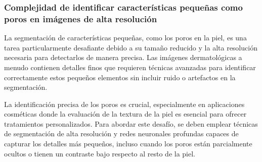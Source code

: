 \cite{zhao2021}

\subsubsection{Complejidad de identificar características pequeñas como poros en imágenes de alta resolución}
La segmentación de características pequeñas, como los poros en la piel, es una tarea particularmente desafiante debido a su tamaño reducido y la alta resolución necesaria para detectarlos de manera precisa. Las imágenes dermatológicas a menudo contienen detalles finos que requieren técnicas avanzadas para identificar correctamente estos pequeños elementos sin incluir ruido o artefactos en la segmentación.

La identificación precisa de los poros es crucial, especialmente en aplicaciones cosméticas donde la evaluación de la textura de la piel es esencial para ofrecer tratamientos personalizados. Para abordar este desafío, se deben emplear técnicas de segmentación de alta resolución y redes neuronales profundas capaces de capturar los detalles más pequeños, incluso cuando los poros están parcialmente ocultos o tienen un contraste bajo respecto al resto de la piel.

\cite{yang2020}
